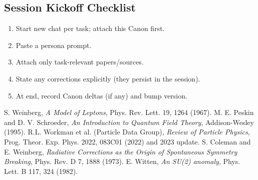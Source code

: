 \documentclass[11pt]{article}
\begin{document}
\subsection*{Session Kickoff Checklist}
    \begin{enumerate}
    \item Start new chat per task; attach this Canon first.
    \item Paste a persona prompt.
    \item Attach only task-relevant papers/sources.
    \item State any corrections explicitly (they persist in the session).
    \item At end, record Canon deltas (if any) and bump version.
    \end{enumerate}


    \begin{thebibliography}{9}
     S. Weinberg, \emph{A Model of Leptons}, Phys. Rev. Lett. 19, 1264 (1967).
     M. E. Peskin and D. V. Schroeder, \emph{An Introduction to Quantum Field Theory}, Addison-Wesley (1995).
     R.L. Workman et al. (Particle Data Group), \emph{Review of Particle Physics}, Prog. Theor. Exp. Phys. 2022, 083C01 (2022) and 2023 update.
     S. Coleman and E. Weinberg, \emph{Radiative Corrections as the Origin of Spontaneous Symmetry Breaking}, Phys. Rev. D 7, 1888 (1973).
     E. Witten, \emph{An SU(2) anomaly}, Phys. Lett. B 117, 324 (1982).
    \end{thebibliography}
\end{document}
